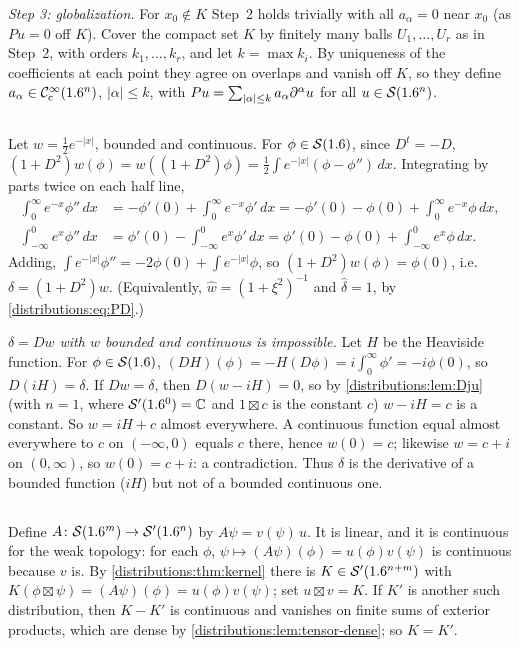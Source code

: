 \emph{Step 3: globalization.} For $x_0\notin K$ Step~2 holds trivially with all
$a_\alpha=0$ near $x_0$ (as $Pu=0$ off $K$). Cover the compact set $K$ by finitely many
balls $U_1,\dots,U_r$ as in Step~2, with orders $k_1,\dots,k_r$, and let $k=\max k_i$. By
uniqueness of the coefficients at each point they agree on overlaps and vanish off
$K$, so they define $a_\alpha\in\mathcal{C}^\infty_{\mathrm{c}}(1.6^n)$, $|\alpha|\le k$, with
$Pu=\sum_{|\alpha|\le k}a_\alpha\partial^\alpha u$ for all $u\in\mathcal{S}(1.6^n)$.

\subsection*{}
Let $w=\frac12e^{-|x|}$, bounded and continuous. For $\phi\in\mathcal{S}(1.6)$, since $D^t=-D$,
$(1+D^2)w(\phi)=w((1+D^2)\phi)=\frac12\int e^{-|x|}(\phi-\phi'')\,dx$. Integrating by parts
twice on each half line,
\begin{align*}
  \int_0^\infty e^{-x}\phi''\,dx&=-\phi'(0)+\int_0^\infty e^{-x}\phi'\,dx
  =-\phi'(0)-\phi(0)+\int_0^\infty e^{-x}\phi\,dx,\\
  \int_{-\infty}^0e^{x}\phi''\,dx&=\phi'(0)-\int_{-\infty}^0e^{x}\phi'\,dx
  =\phi'(0)-\phi(0)+\int_{-\infty}^0e^{x}\phi\,dx.
\end{align*}
Adding, $\int e^{-|x|}\phi''=-2\phi(0)+\int e^{-|x|}\phi$, so
$(1+D^2)w(\phi)=\phi(0)$, i.e.\ $\delta=(1+D^2)w$. (Equivalently,
$\hat w=(1+\xi^2)^{-1}$ and $\hat\delta=1$, by \eqref{distributions:eq:PD}.)

\emph{$\delta=Dw$ with $w$ bounded and continuous is impossible.} Let $H$ be the
Heaviside function. For $\phi\in\mathcal{S}(1.6)$, $(DH)(\phi)=-H(D\phi)=i\int_0^\infty\phi'=-i\phi(0)$,
so $D(iH)=\delta$. If $Dw=\delta$, then $D(w-iH)=0$, so by \cref{distributions:lem:Dju}
(with $n=1$, where $\mathcal{S}'(1.6^0)=\mathbb{C}$ and $1\boxtimes c$ is the constant $c$) $w-iH=c$ is a
constant. So $w=iH+c$ almost everywhere. A continuous function equal almost everywhere
to $c$ on $(-\infty,0)$ equals $c$ there, hence $w(0)=c$; likewise $w=c+i$ on
$(0,\infty)$, so $w(0)=c+i$: a contradiction. Thus $\delta$ is the derivative of a
bounded function ($iH$) but not of a bounded continuous one.

\subsection*{}
Define $A\colon\mathcal{S}(1.6^m)\to\mathcal{S}'(1.6^n)$ by $A\psi=v(\psi)\,u$. It is linear, and it is
continuous for the weak topology: for each $\phi$, $\psi\mapsto(A\psi)(\phi)=u(\phi)v(\psi)$
is continuous because $v$ is. By \cref{distributions:thm:kernel} there is
$K\in\mathcal{S}'(1.6^{n+m})$ with $K(\phi\boxtimes\psi)=(A\psi)(\phi)=u(\phi)v(\psi)$; set
$u\boxtimes v=K$. If $K'$ is another such distribution, then $K-K'$ is continuous and
vanishes on finite sums of exterior products, which are dense by
\cref{distributions:lem:tensor-dense}; so $K=K'$.

